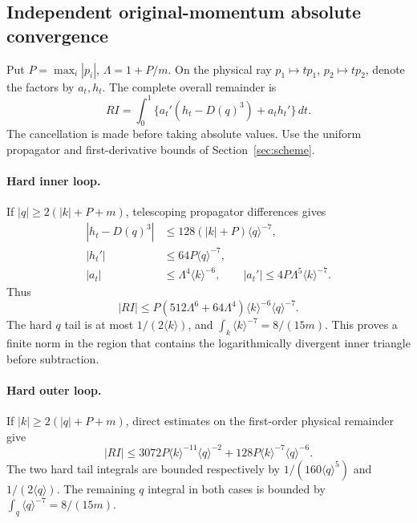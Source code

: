 \subsection{Independent original-momentum absolute convergence}

Put $P=\max_i|p_i|$, $\Lambda=1+P/m$. On the physical ray
$p_1\mapsto tp_1$, $p_2\mapsto tp_2$, denote the factors by $a_t,h_t$.
The complete overall remainder is
\[
 RI=\int_0^1\{a_t'(h_t-D(q)^3)+a_t h_t'\}\,dt.
\]
The cancellation is made before taking absolute values. Use the uniform
propagator and first-derivative bounds of Section~\ref{sec:scheme}.

\paragraph{Hard inner loop.}
If $|q|\ge2(|k|+P+m)$, telescoping propagator differences gives
\begin{align*}
 |h_t-D(q)^3|&\le128(|k|+P)\langle q\rangle^{-7},\\
 |h_t'|&\le64P\langle q\rangle^{-7},\\
 |a_t|&\le\Lambda^4\langle k\rangle^{-6},\qquad
 |a_t'|\le4P\Lambda^5\langle k\rangle^{-7}.
\end{align*}
Thus
\[
 |RI|\le P(512\Lambda^6+64\Lambda^4)
                      \langle k\rangle^{-6}\langle q\rangle^{-7}.
\]
The hard $q$ tail is at most $1/(2\langle k\rangle)$, and
$\int_k\langle k\rangle^{-7}=8/(15m)$. This proves a finite norm in
the region that contains the logarithmically divergent inner triangle
before subtraction.

\paragraph{Hard outer loop.}
If $|k|\ge2(|q|+P+m)$, direct estimates on the first-order physical
remainder give
\[
 |RI|\le3072P\langle k\rangle^{-11}\langle q\rangle^{-2}
            +128P\langle k\rangle^{-7}\langle q\rangle^{-6}.
\]
The two hard tail integrals are bounded respectively by
$1/(160\langle q\rangle^5)$ and $1/(2\langle q\rangle)$.
The remaining $q$ integral in both cases is bounded by
$\int_q\langle q\rangle^{-7}=8/(15m)$.

